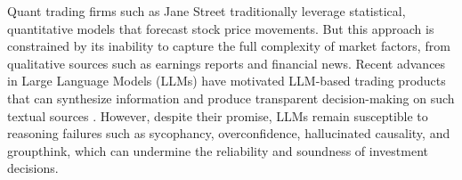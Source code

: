\documentclass{article}
\begin{document}




Quant trading firms such as Jane Street traditionally leverage statistical, quantitative models that forecast stock price movements. But this approach is constrained by its inability to capture the full complexity of market factors, from qualitative sources such as earnings reports and financial news. Recent advances in Large Language Models (LLMs) have motivated LLM-based trading products that can synthesize information and produce transparent decision-making on such textual sources \citep{2025tradingagents}. However, despite their promise, LLMs remain susceptible to reasoning failures such as sycophancy, overconfidence, hallucinated causality, and groupthink, which can undermine the reliability and soundness of investment decisions. 
\end{document}
